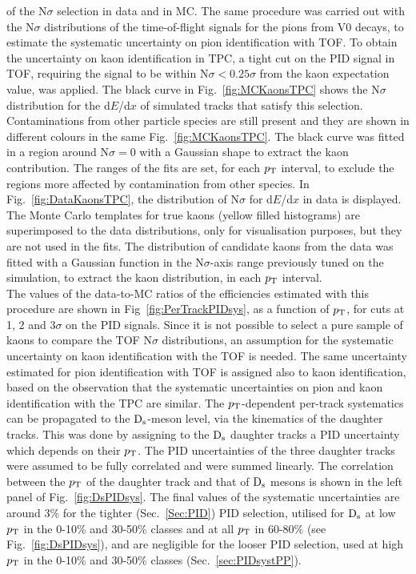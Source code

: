  of the N$\sigma$ selection in data and in MC.
The same procedure
was carried out with the N$\sigma$ distributions of the time-of-flight signals 
for the pions from V0 decays, to estimate the systematic uncertainty on pion identification with TOF.
To obtain the uncertainty on kaon identification in TPC, a tight cut on the PID 
signal in TOF, requiring the signal to be within N$\sigma < 0.25\sigma$ from the 
kaon expectation value, was applied. 
The black curve in Fig.~\ref{fig:MCKaonsTPC} shows the 
N$\sigma$ distribution for the d$E$/d$x$ of simulated tracks that satisfy this selection.
Contaminations from other particle species are still present and they
are shown in different colours in the same Fig.~\ref{fig:MCKaonsTPC}. 
The black curve was fitted in a region around N$\sigma=0$ with a Gaussian shape 
to extract the kaon contribution. The ranges of the fits are set, for each $p_{\rm T}$ interval, to exclude 
the regions more affected by contamination from other species.
In Fig.~\ref{fig:DataKaonsTPC}, the distribution of N$\sigma$ for d$E$/d$x$ in data is displayed. 
The Monte Carlo templates for true 
kaons (yellow filled histograms) are superimposed to the data distributions, 
only for visualisation purposes, but they are not used in the fits. The distribution of candidate kaons from the data
was fitted with a Gaussian function in the N$\sigma$-axis range previously tuned on the simulation,
to extract the kaon distribution, in each $p_{\rm T}$ interval.\\
The values of the data-to-MC ratios
of the efficiencies estimated with this procedure are shown in Fig~\ref{fig:PerTrackPIDsys}, as a function of $p_{\rm T}$,
for cuts at 1, 2 and 3$\sigma$ on the PID signals. 
Since it is not possible to select a pure sample of kaons to compare the TOF N$\sigma$
distributions, an assumption for the systematic uncertainty on kaon
identification with the TOF is needed. The same uncertainty estimated
for pion identification with TOF is assigned also to kaon identification, based on
the observation that the systematic uncertainties on pion and kaon identification
with the TPC are similar.
The $p_{\rm T}$-dependent per-track systematics can be propagated to the ${\rm D_s}$-meson level, via the kinematics of
the daughter tracks.
This was done by assigning to the ${\rm D_s}$ daughter tracks a PID uncertainty 
which depends on their $p_{\rm T}$. The PID uncertainties of the three daughter tracks
were assumed to be fully correlated and were summed linearly.
The correlation between the $p_{\rm T}$ of the daughter track and that of ${\rm D_s}$ mesons is shown in the
left panel of Fig.~\ref{fig:DsPIDsys}.
The final values of the systematic uncertainties are around 
3\% for the tighter (Sec.~\ref{Sec:PID}) PID selection, utilised for ${\rm D_s}$ at low $p_{\rm T}$ in the 0-10\% and 30-50\% classes and at all $p_{\rm T}$ in 60-80\% (see Fig.~\ref{fig:DsPIDsys}), and are negligible for the
looser PID selection, used at high $p_{\rm T}$ in the 0-10\% and 30-50\% classes (Sec.~\ref{sec:PIDsystPP}).

